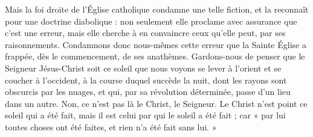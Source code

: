 Mais la foi droite de l’Église catholique condamne une telle fiction, et la reconnaît pour une doctrine diabolique : non seulement elle proclame avec assurance que c’est une erreur, mais elle cherche à en convaincre ceux qu’elle peut, par ses raisonnements. Condamnons donc nous-mêmes cette erreur que la Sainte Église a frappée, dès le commencement, de ses anathèmes. Gardons-nous de penser que le Seigneur Jésus-Christ soit ce soleil que nous voyons se lever à l’orient et se coucher à l’occident, à la course duquel succède la nuit, dont les rayons sont obscurcis par les nuages, et qui, par sa révolution déterminée, passe d’un lieu dans un autre. Non, ce n’est pas là le Christ, le Seigneur. Le Christ n’est point ce soleil qui a été fait, mais il est celui par qui le soleil a été fait ; car « par lui toutes choses ont été faites, et rien n’a été fait sans lui. »
